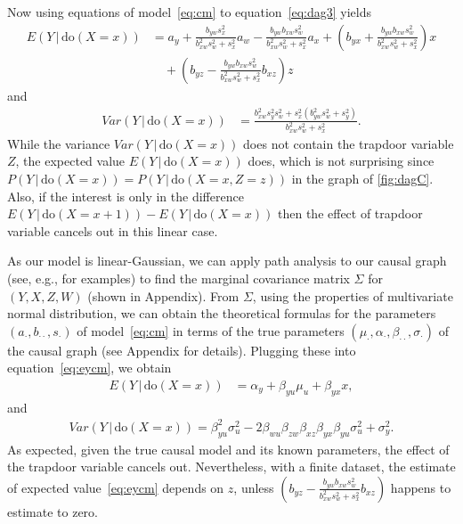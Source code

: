 \documentclass[11pt,a4paper,twoside]{article}
\newcommand{\+}[1]{\ensuremath{\mathbf{#1}}}
\newcommand{\doo}{\textrm{do}}
\newcommand{\given}{{ \, | \, }}
\newcommand{\z}{trapdoor variable}
\begin{document}
	Now using equations of model~\eqref{eq:cm} to equation~\eqref{eq:dag3} yields
	\begin{equation} 
	\label{eq:eycm}
	\begin{aligned}
	E(Y \given  \doo(X = x)) &= 
	a_y + \frac{b_{yw}s_x^2}{b_{xw}^2 s_w^2+s_x^2}a_w - \frac{b_{yw}b_{xw}s_w^2}{b_{xw}^2 s_w^2+s_x^2}a_x
	+ \left(b_{yx} + \frac{b_{yw} b_{xw} s_w^2}{b_{xw}^2 s_w^2+s_x^2}\right)x\\
	&\quad+ \left(b_{yz} -\frac{b_{yw} b_{xw} s_w^2}{b_{xw}^2 s_w^2+s_x^2}b_{xz}\right)z
	\end{aligned}
	\end{equation}
	and
	\begin{equation*}
	\begin{aligned}
	Var(Y \given  \doo(X = x)) &= \frac{b_{xw}^2 s_y^2 s_w^2+s_x^2 \left(b_{yw}^2 s_w^2+s_y^2\right)}{b_{xw}^2 s_w^2+s_x^2}.
	\end{aligned}
	\end{equation*}
	While the variance $Var(Y \given  \doo(X = x))$ does not contain the \z{} $Z$, the expected value $E(Y \given  \doo(X = x))$ does, which is not surprising since $P(Y \given \doo(X = x)) = P(Y \given \doo(X = x, Z = z))$ in the graph of \autoref{fig:dagC}. Also, if the interest is only in the difference $E(Y \given \doo(X = x+1)) - E(Y \given \doo(X = x))$ then the effect of \z{} cancels out in this linear case.
	
	As our model is linear-Gaussian, we can apply path analysis \citep{wright1934} to our causal graph (see, e.g., \citet{Pearl2013} for examples) to find the marginal covariance matrix $\Sigma$ for $(Y, X, Z, W)$ (shown in Appendix). From $\Sigma$, using the properties of multivariate normal distribution, we can obtain the theoretical formulas for the parameters $(a_{\cdot}, b_{\cdot\cdot}, s_{\cdot})$ of model~\eqref{eq:cm} in terms of the true parameters $(\mu_{\cdot}, \alpha_{\cdot},\beta_{\cdot\cdot},\sigma_{\cdot})$ of the causal graph (see Appendix for details). Plugging these into equation~\eqref{eq:eycm}, we obtain
	\begin{equation*}
	\begin{aligned}
	E(Y \given  \doo(X = x)) &= \alpha_y + \beta_{yu}\mu_u + \beta_{yx} x,
	\end{aligned}
	\end{equation*}
	and
	\begin{equation*}
	\begin{aligned}
	Var(Y \given  \doo(X = x)) = \beta_{yu}^2\sigma_u^2 - 2\beta_{wu}\beta_{zw}\beta_{xz}\beta_{yx}\beta_{yu}\sigma_u^2 + \sigma_y^2.
	\end{aligned}
	\end{equation*}
	As expected, given the true causal model and its known parameters, the effect of the \z{} cancels out. Nevertheless, with a finite dataset, the estimate of expected value~\eqref{eq:eycm} depends on $z$, unless $\left(b_{yz} -\frac{b_{yw} b_{xw} s_w^2}{b_{xw}^2 s_w^2+s_x^2}b_{xz}\right)$ happens to estimate to zero.
	
\end{document}

